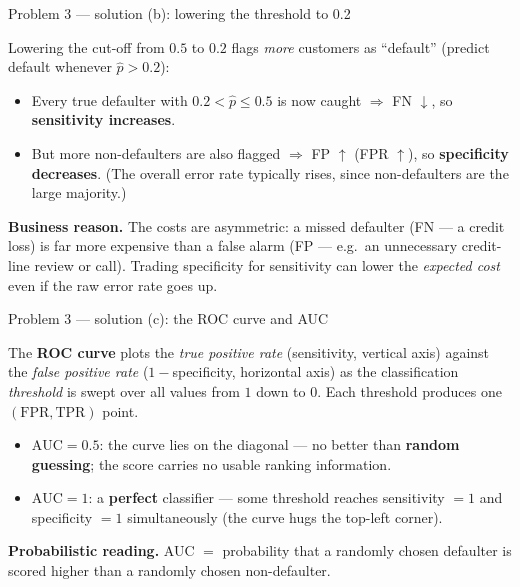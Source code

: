 \documentclass[aspectratio=169,11pt]{beamer}
\begin{document}
\begin{frame}{Problem 3 --- solution (b): lowering the threshold to 0.2}
  \begin{solutionbox}
    Lowering the cut-off from $0.5$ to $0.2$ flags \emph{more} customers as ``default''
    (predict default whenever $\hat{p}>0.2$):
    \begin{itemize}
      \item Every true defaulter with $0.2<\hat{p}\le 0.5$ is now caught $\Rightarrow$
        FN $\downarrow$, so \textbf{sensitivity increases}.
      \item But more non-defaulters are also flagged $\Rightarrow$ FP $\uparrow$
        (FPR $\uparrow$), so \textbf{specificity decreases}. (The overall error rate
        typically rises, since non-defaulters are the large majority.)
    \end{itemize}
    \textbf{Business reason.} The costs are asymmetric: a missed defaulter (FN --- a credit
    loss) is far more expensive than a false alarm (FP --- e.g.\ an unnecessary credit-line
    review or call). Trading specificity for sensitivity can lower the \emph{expected cost}
    even if the raw error rate goes up.
  \end{solutionbox}
\end{frame}

\begin{frame}{Problem 3 --- solution (c): the ROC curve and AUC}
  \begin{solutionbox}
    The \textbf{ROC curve} plots the \emph{true positive rate} (sensitivity, vertical axis)
    against the \emph{false positive rate} ($1-$specificity, horizontal axis) as the
    classification \emph{threshold} is swept over all values from $1$ down to $0$. Each
    threshold produces one $(\text{FPR},\text{TPR})$ point.
    \begin{itemize}
      \item $\text{AUC}=0.5$: the curve lies on the diagonal --- no better than
        \textbf{random guessing}; the score carries no usable ranking information.
      \item $\text{AUC}=1$: a \textbf{perfect} classifier --- some threshold reaches
        sensitivity $=1$ and specificity $=1$ simultaneously (the curve hugs the top-left
        corner).
    \end{itemize}
    \textbf{Probabilistic reading.} AUC $=$ probability that a randomly chosen defaulter is
    scored higher than a randomly chosen non-defaulter.
  \end{solutionbox}
\end{frame}
\end{document}

